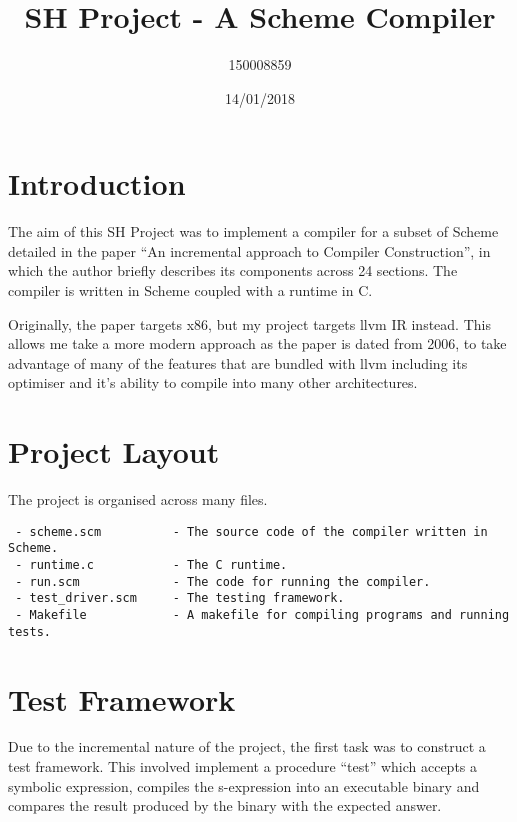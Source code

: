 \documentclass{article}
\title{SH Project - A Scheme Compiler}
\date{14/01/2018}
\author{150008859}
\begin{document}
\maketitle
\newpage

\section{Introduction}

The aim of this SH Project was to implement a compiler for a subset of Scheme detailed in the paper ``An incremental approach to Compiler Construction'', in which the author briefly describes its components across 24 sections. The compiler is written in Scheme coupled with a runtime in C.

Originally, the paper targets x86, but my project targets llvm IR instead. This allows me take a more modern approach as the paper is dated from 2006, to take advantage of many of the features that are bundled with llvm including its optimiser and it's ability to compile into many other architectures. 

\section{Project Layout}

The project is organised across many files.

\begin{verbatim}
 - scheme.scm          - The source code of the compiler written in Scheme.
 - runtime.c           - The C runtime.
 - run.scm             - The code for running the compiler.
 - test_driver.scm     - The testing framework.
 - Makefile            - A makefile for compiling programs and running tests. 
\end{verbatim}


\section{Test Framework}

Due to the incremental nature of the project, the first task was to construct a test framework. This involved implement a procedure ``test'' which accepts a symbolic expression, compiles the s-expression into an executable binary and compares the result produced by the binary with the expected answer.
\end{document}
